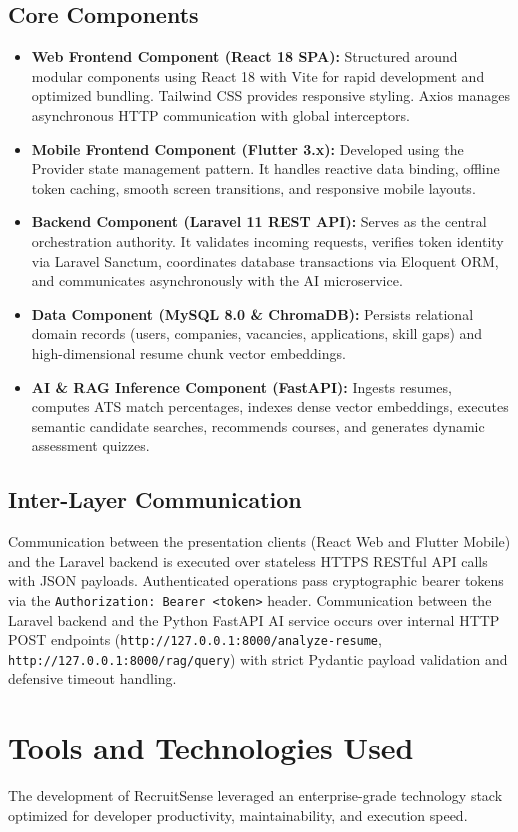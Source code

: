 \subsection{Core Components}
\begin{itemize}
    \item \textbf{Web Frontend Component (React 18 SPA):} Structured around modular components using React 18 with Vite for rapid development and optimized bundling. Tailwind CSS provides responsive styling. Axios manages asynchronous HTTP communication with global interceptors.
    \item \textbf{Mobile Frontend Component (Flutter 3.x):} Developed using the Provider state management pattern. It handles reactive data binding, offline token caching, smooth screen transitions, and responsive mobile layouts.
    \item \textbf{Backend Component (Laravel 11 REST API):} Serves as the central orchestration authority. It validates incoming requests, verifies token identity via Laravel Sanctum, coordinates database transactions via Eloquent ORM, and communicates asynchronously with the AI microservice.
    \item \textbf{Data Component (MySQL 8.0 \& ChromaDB):} Persists relational domain records (users, companies, vacancies, applications, skill gaps) and high-dimensional resume chunk vector embeddings.
    \item \textbf{AI \& RAG Inference Component (FastAPI):} Ingests resumes, computes ATS match percentages, indexes dense vector embeddings, executes semantic candidate searches, recommends courses, and generates dynamic assessment quizzes.
\end{itemize}

\subsection{Inter-Layer Communication}
Communication between the presentation clients (React Web and Flutter Mobile) and the Laravel backend is executed over stateless HTTPS RESTful API calls with JSON payloads. Authenticated operations pass cryptographic bearer tokens via the \texttt{Authorization: Bearer <token>} header. Communication between the Laravel backend and the Python FastAPI AI service occurs over internal HTTP POST endpoints (\texttt{http://127.0.0.1:8000/analyze-resume}, \texttt{http://127.0.0.1:8000/rag/query}) with strict Pydantic payload validation and defensive timeout handling.

\section{Tools and Technologies Used}
The development of RecruitSense leveraged an enterprise-grade technology stack optimized for developer productivity, maintainability, and execution speed.

